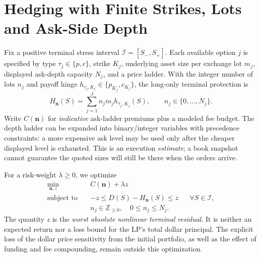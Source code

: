 \section{Hedging with Finite Strikes, Lots and Ask-Side Depth}
Fix a positive terminal stress interval $\mathcal I=[S_-,S_+]$. Each available option $j$ is specified by type $\tau_j\in\{p,c\}$, strike $K_j$, underlying asset size per exchange lot $m_j$, displayed ask-depth capacity $N_j$, and a price ladder. With the integer number of lots $n_j$ and payoff hinge $h_{\tau_j,K_j}\in\{p_{K_j},c_{K_j}\}$, the long-only terminal protection is
\begin{equation}
 H_{\bm n}(S)=\sum_{j=1}^J n_jm_jh_{\tau_j,K_j}(S),
 \qquad n_j\in\{0,\ldots,N_j\}.
\label{eq:hedge}
\end{equation}
Write $C(\bm n)$ for \emph{indicative} ask-ladder premiums plus a modeled fee budget. The depth ladder can be expanded into binary/integer variables with precedence constraints: a more expensive ask level may be used only after the cheaper displayed level is exhausted. This is an execution \emph{estimate}; a book snapshot cannot guarantee the quoted sizes will still be there when the orders arrive.

For a risk-weight $\lambda\ge0$, we optimize
\begin{equation}
\begin{aligned}
 \min_{\bm n,z}\quad&C(\bm n)+\lambda z\\
 \text{subject to}\quad&
   -z\le D(S)-H_{\bm n}(S)\le z
      &&\forall S\in\mathcal I,\\
 &n_j\in\mathbb{Z}_{\ge0},\quad 0\le n_j\le N_j.
\end{aligned}
\label{eq:minimax}
\end{equation}
The quantity $z$ is the \emph{worst absolute nonlinear terminal residual}. It is neither an expected return nor a loss bound for the LP's total dollar principal. The explicit loss of the dollar price sensitivity from the initial portfolio, as well as the effect of funding and fee compounding, remain outside this optimization.

